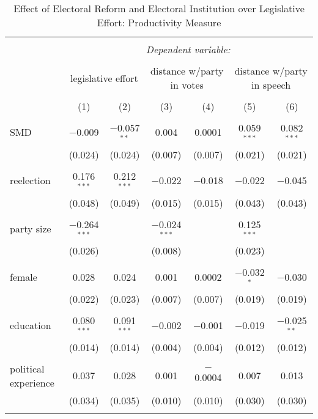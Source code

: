 \documentclass{article}
\begin{document}
\begin{table}[!htbp] \centering 
  \caption{Effect of Electoral Reform and Electoral Institution over Legislative Effort: Productivity Measure} 
  \label{} 
\begin{tabular}{@{\extracolsep{5pt}}lcccccc} 
\\[-1.8ex]\hline 
\hline \\[-1.8ex] 
 & \multicolumn{6}{c}{\textit{Dependent variable:}} \\ 
\cline{2-7} 
\\[-1.8ex] & \multicolumn{2}{c}{legislative effort} & \multicolumn{2}{c}{distance w/party in votes} & \multicolumn{2}{c}{distance w/party in speech} \\ 
\\[-1.8ex] & (1) & (2) & (3) & (4) & (5) & (6)\\ 
\hline \\[-1.8ex] 
 SMD & $-$0.009 & $-$0.057$^{**}$ & 0.004 & 0.0001 & 0.059$^{***}$ & 0.082$^{***}$ \\ 
  & (0.024) & (0.024) & (0.007) & (0.007) & (0.021) & (0.021) \\ 
  & & & & & & \\ 
 reelection & 0.176$^{***}$ & 0.212$^{***}$ & $-$0.022 & $-$0.018 & $-$0.022 & $-$0.045 \\ 
  & (0.048) & (0.049) & (0.015) & (0.015) & (0.043) & (0.043) \\ 
  & & & & & & \\ 
 party size & $-$0.264$^{***}$ &  & $-$0.024$^{***}$ &  & 0.125$^{***}$ &  \\ 
  & (0.026) &  & (0.008) &  & (0.023) &  \\ 
  & & & & & & \\ 
 female & 0.028 & 0.024 & 0.001 & 0.0002 & $-$0.032$^{*}$ & $-$0.030 \\ 
  & (0.022) & (0.023) & (0.007) & (0.007) & (0.019) & (0.019) \\ 
  & & & & & & \\ 
 education & 0.080$^{***}$ & 0.091$^{***}$ & $-$0.002 & $-$0.001 & $-$0.019 & $-$0.025$^{**}$ \\ 
  & (0.014) & (0.014) & (0.004) & (0.004) & (0.012) & (0.012) \\ 
  & & & & & & \\ 
 political experience & 0.037 & 0.028 & 0.001 & $-$0.0004 & 0.007 & 0.013 \\ 
  & (0.034) & (0.035) & (0.010) & (0.010) & (0.030) & (0.030) \\ 
  & & & & & & \\ 

\end{tabular}
\end{table}
\end{document}
